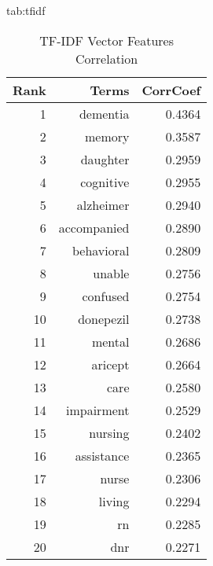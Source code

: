 \documentclass[pmlr,twocolumn]{jmlr} %
\begin{document}
\begin{table}[hbtp]
\floatconts
  {tab:tfidf}
  {\begin{tabular}{rrr}
  \toprule 
  \bfseries Rank & \bfseries Terms & \bfseries CorrCoef\\
  \midrule
  1 & dementia    & 0.4364 \\
  2 & memory      & 0.3587 \\
  3 & daughter    & 0.2959 \\
  4 & cognitive   & 0.2955 \\
  5 & alzheimer   & 0.2940 \\
  6 & accompanied & 0.2890 \\
  7 & behavioral  & 0.2809 \\
  8 & unable      & 0.2756 \\
  9 & confused    & 0.2754 \\
  10 & donepezil  & 0.2738 \\
  11 & mental     & 0.2686 \\
  12 & aricept    & 0.2664 \\
  13 & care       & 0.2580 \\
  14 & impairment & 0.2529 \\
  15 & nursing    & 0.2402 \\
  16 & assistance & 0.2365 \\
  17 & nurse      & 0.2306 \\
  18 & living     & 0.2294 \\
  19 & rn         & 0.2285 \\
  20 & dnr        & 0.2271 \\
  \bottomrule
  \end{tabular}
  \label{table:tdf}}
  {\caption{TF-IDF Vector Features Correlation}}
\end{table}
\end{document}
